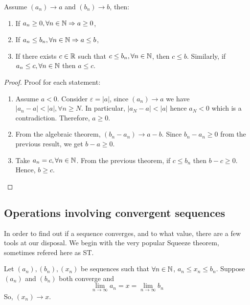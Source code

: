\begin{theorem}
    Assume $(a_n) \to a$ and $( b_n) \to b$, then:
    \begin{enumerate}
        \item If $a_n \geq 0, \forall n \in \mathbb{N} \Rightarrow a \geq 0$,
        \item If $a_n \leq b_n, \forall n \in \mathbb{N} \Rightarrow a \leq b$,
        \item If there exists $c \in \mathbb{R}$ such that $c \leq b_n, \forall n \in \mathbb{N}$, then $c \leq b$. Similarly, if $a_n \leq c, \forall n \in \mathbb{N}$ then $a \leq c$.
    \end{enumerate}
\end{theorem}

\begin{proof}
    Proof for each statement:
    \begin{enumerate}
        \item Assume $a < 0$. Consider $\varepsilon  = |a|$, since $( a_n) \to a$ we have $|a_n - a|< |a|, \forall n \geq N$. In particular, $|a_N - a|<|a|$ hence $a_N < 0$ which is a contradiction. Therefore, $a \geq 0$.
        \item From the algebraic theorem,  $( b_n - a_n) \to a-b$. Since $b_n-a_n \geq 0$ from the previous result, we get $b - a \geq 0$.
        \item Take $a_n = c, \forall n \in \mathbb{N}$. From the previous theorem, if $c \leq b_n$ then $b-c \geq 0$. Hence, $b \geq c$.
    \end{enumerate}
\end{proof}

\subsection{Operations involving convergent sequences}

In order to find out if a sequence converges, and to what value, there are a few tools at our disposal. We begin with the very popular Squeeze theorem, sometimes refered here as ST.

\begin{theorem}
    Let $(a_n), (b_n), (x_n)$ be sequences such that $\forall n \in \mathbb{N}$, $a_n \leq x_n \leq b_n$. Suppose $(a_n)$ and $(b_n)$ both converge and
    \begin{equation*}
        \lim \limits_{n \to \infty} a_n = x = \lim \limits_{n \to \infty} b_n
    \end{equation*}
    So, $(x_n) \to x$.
\end{theorem}

